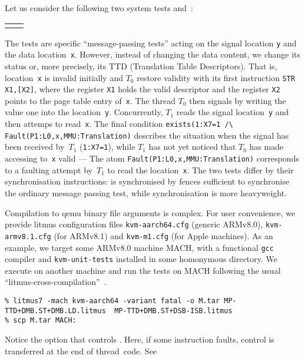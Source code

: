 Let us consider the following two system tests
 and~:
\begin{center}
\begin{tabular}{p{.45\linewidth}p{.4\linewidth}}

&

\end{tabular}
\end{center}
The tests are specific ``message-passing tests'' acting on the signal
location \texttt{y} and the data location~\texttt{x}. However, instead
of changing the data content, we change its status or, more precisely,
its TTD (Translation Table Descriptors). That is, location~\texttt{x} is
invalid initially and $T_0$ restore validity with its first
instruction \texttt{STR X1,[X2]}, where the register \texttt{X1} holds
the valid descriptor and the register \texttt{X2} points to the page table
entry of~\texttt{x}. The thread $T_0$ then signals by writing the
value one into the location~\texttt{y}. Concurrently, $T_1$ reads the
signal location~\texttt{y} and then attemps to read~\texttt{x}.
The final condition
\verb+exists(1:X7=1 /\ Fault(P1:L0,x,MMU:Translation)+
describes the situation when the signal has been received by~$T_1$
(\texttt{1:X7=1}), while $T_1$ has not yet noticed that $T_0$ has made
accessing to~\texttt{x} valid
--- The atom \texttt{Fault(P1:L0,x,MMU:Translation)} corresponds to a
faulting attempt by~$T_1$ to read the location~\texttt{x}.
The two tests differ by their synchronisation
instructions:  is synchronised by fences
sufficient to synchronise the ordinary message passing test,
while   synchronisation is more
heavyweight.

Compilation to qemu binary file arguments is complex.
For user convenience, we provide litmus configuration
files \texttt{kvm-aarch64.cfg} (generic
ARMv8.0), \texttt{kvm-armv8.1.cfg} (for ARMv8.1)
and  \texttt{kvm-m1.cfg} (for Apple machines).
As an example, we target some ARMv8.0 machine MACH, with a
functional \texttt{gcc} compiler and \texttt{kvm-unit-tests} installed
in some homonymous directory.  We execute \litmus{} on another machine
and run the tests on MACH following the usual
``litmus-cross-compilation''~.
\begin{verbatim}
% litmus7 -mach kvm-aarch64 -variant fatal -o M.tar MP-TTD+DMB.ST+DMB.LD.litmus  MP-TTD+DMB.ST+DSB-ISB.litmus
% scp M.tar MACH:
\end{verbatim}
Notice the  option that
controls . Here,
if some instruction faults, control is transferred at the end of thread~code. See 

